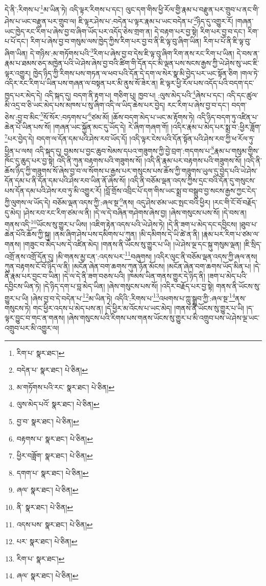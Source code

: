 དེ་ནི་:རིགས་པ་\footnote{རིག་པ་  སྣར་ཐང་། }མ་ཡིན་ཏེ། འདི་ལྟར་རིགས་པ་དང་། ལུང་དག་གིས་ཕྱི་རོལ་གྱི་རྣམ་པ་བརྫུན་པར་གྲུབ་པ་ནང་གི་ཤེས་པ་ཡང་བརྫུན་པར་གྲུབ་ལ། ཇི་ལྟར་ཤེས་པ་:བདེན་པ་ལྟར་རྣམ་པ་ཡང་བདེན་པ་\footnote{བདེན་པ་  སྣར་ཐང་།  པེ་ཅིན། }ཉིད་དུ་འགྱུར་རོ། །གཞན་ཡང་ཁྱེད་རང་རིག་པ་ཞེས་བྱ་བ་ཞིག་ཡོད་པར་འདོད་ཅེས་གྲག་ན། དེ་བརྟག་པར་བྱ་སྟེ། རིག་པར་བྱ་བ་དང་། རིག་པ་པོ་དང་། རིག་པ་ཞེས་བྱ་བ་གསུམ་ལས་ཁྱེད་ཀྱིས་རིག་པར་བྱ་བ་ནི་ཇི་ལྟ་བུ་ཞིག་ཡིན། རིག་པ་པོ་ནི་ཇི་ལྟ་བུ་ཞིག་ཡིན། དེ་གཉིས་:མ་གཏོགས་པའི་\footnote{མ་གཏོགས་པའི་རང་  སྣར་ཐང་།  པེ་ཅིན། }རིག་པ་ཞེས་བྱ་བ་དེས་ཇི་ལྟ་བུ་ཞིག་རིག་ནས་རང་རིག་པ་ཡིན། དེ་བས་ན་རྣམ་པ་ཐམས་ཅད་མཁྱེན་པའི་ཡེ་ཤེས་ཞེས་བྱ་བའི་ཚིག་གི་དོན་དང་མི་ལྡན་པས་སངས་རྒྱས་ཀྱི་ཡེ་ཤེས་སུ་ཡང་ཇི་ལྟར་འགྱུར། ཁྱེད་ཉིད་ཀྱི་རིགས་པས་གཏན་ལ་ཕབ་པའི་དོན་དེ་དག་ལ་སེར་སྣ་མི་བྱེད་པར་ཡང་སྟོན་ཅིག །གལ་ཏེ་འདིར་རང་རིག་པ་ཡིན་པས་གཞན་ལ་བསྟན་པར་མི་ནུས་སོ་ཟེར་ན། ཇི་ལྟར་ཕྱི་རོལ་པས་འདོད་པའི་བདག་དང་ཁྱད་པར་མེད་དེ། འདི་སྐད་དུ། བདག་ནི་རྟག་པ། གཅིག་པུ། ཁྱབ་པ། :ལུས་མེད་པའི་\footnote{ལུས་མེད་པའོ་  སྣར་ཐང་།  པེ་ཅིན། }ཞེས་པ་དང་། འདི་དང་ཚུལ་མི་འདྲ་བ་ཅི་ཡང་མེད་པས་མཁས་པ་སུ་ཞིག་འདི་ལ་ཡིད་ཆེས་པར་བྱེད། རང་རིག་པ་ཞེས་བྱ་བ་དང་། བདག་ཅེས་:བྱ་བ་མིང་\footnote{བྱ་བ་  སྣར་ཐང་།  པེ་ཅིན། }སོ་སོར་:བཏགས་པ་\footnote{བརྟགས་པ་  སྣར་ཐང་།  པེ་ཅིན། }ཙམ་མོ། །ཆོས་བདག་མེད་པ་ཡང་མ་རྟོགས་ཏེ། འདི་ཉིད་བདག་ཏུ་འཛིན་པ་ཆེན་པོ་ཡིན་པས་སོ། །གཞན་ཡང་སྐྱོན་མང་དུ་ཡོད་དེ། རེ་ཞིག་གཞག་གོ། །འདིར་རྣམ་པ་མེད་པར་སྨྲ་བ་:ཕྱིར་ཟློག་\footnote{ཕྱིར་བཟློག་  སྣར་ཐང་།  པེ་ཅིན། }པར་བྱེད་དེ། བདག་ལ་དོན་དམ་པའི་ཤེས་རབ་ཡོད་དོ། །འདི་ལྟར་ངེས་པའི་དོན་སྟོན་པའི་ཤེས་རབ་ཀྱི་ཕ་རོལ་ཏུ་ཕྱིན་པ་ལས། འདི་སྐད་དུ། བྱམས་པ་བྱང་ཆུབ་སེམས་དཔའ་གཟུགས་ཀྱི་བྱེ་བྲག་:གདགས་པ་\footnote{དགག་པ་  སྣར་ཐང་།  པེ་ཅིན། }རྣམ་པ་གསུམ་གྱིས་ཁོང་དུ་ཆུད་པར་བྱ་སྟེ། འདི་ནི་ཀུན་བརྟགས་པའི་གཟུགས་སོ། །འདི་ནི་རྣམ་པར་བརྟགས་པའི་གཟུགས་སོ། །འདི་ནི་ཆོས་ཉིད་ཀྱི་གཟུགས་སོ་ཞེས་བྱ་བ་ལ་སོགས་པ་རྒྱས་པར་གསུངས་པས་ཆོས་ཀྱི་གཟུགས་ཡུལ་དུ་བྱེད་པའི་ཡེ་ཤེས་དོན་དམ་པ་ནི་དོན་དམ་པའི་ཤེས་རབ་ཡིན་ནོ་ཞེས་སོ། །འདི་ནི་བཅོམ་ལྡན་འདས་ཀྱིས་དྲང་བའི་དོན་དུ་གསུངས་པས་དོན་དམ་པའི་ཤེས་རབ་ཏུ་མི་འགྱུར་རོ། །བློ་གྲོས་འབྲིང་པོ་དག་གིས་ཡང་སྨྲ་བ་བསྒྲུབ་བྱ་སངས་རྒྱས་ཀྱང་ངེད་ཀྱི་ལུགས་ལ་ཡོད་དེ། བཅོམ་ལྡན་འདས་ཀྱི་:ཞལ་སྔ་\footnote{ཞལ་  སྣར་ཐང་།  པེ་ཅིན། }ནས། འདུ་ཤེས་ཙམ་ཡང་སྤང་བའི་ཕྱིར། །རང་གི་ངོ་བོ་བརྗོད་དུ་མེད། །ཤེས་རབ་རང་རིག་ཙམ་ལ་ནི། །དེ་ལ་དེ་བཞིན་གཤེགས་ཞེས་བྱ། །ཞེས་གསུངས་པས་སོ། །དེ་བས་ན། གནས་འདི་\footnote{ནི་  སྣར་ཐང་།  པེ་ཅིན། }ཡོངས་སུ་གྱུར་པ་ཡིས། །འཇིག་རྟེན་འདས་པའི་ཡེ་ཤེས་ཏེ། །དེ་ནི་ཟག་པ་མེད་དང་དབྱིངས། །ཐུབ་པ་ཆེན་པོའི་ཆོས་ཀྱི་སྐུ། །ནམ་ཞིག་ཤེས་པས་དམིགས་པ་ཀུན། །མི་དམིགས་དེ་ཡི་ཚེ་ན་ནི། །རྣམ་པར་རིག་པ་ཙམ་ལ་གནས། །གཟུང་བ་མེད་པས་དེ་འཛིན་མེད། །གནས་ནི་ཡོངས་སུ་གྱུར་པ་ཡི། །ཡེ་ཤེས་ལྔ་དང་སྐུ་གསུམ་ལྡན། །ཇི་སྲིད་འགྲོ་ནས་འགྲོ་དོན་དུ། །མི་གནས་མྱ་ངན་:འདས་པར་\footnote{འདས་པས་  སྣར་ཐང་།  པེ་ཅིན། }བཞུགས། །འདིར་ལུང་ནི་བཅོམ་ལྡན་འདས་ཀྱི་ཞལ་ནས། ཀུན་བརྟགས་ངོ་བོ་ཉིད་ལ་ནི། །མངོན་ཞེན་བག་ཆགས་ཀུན་ཉོན་མོངས། །མངོན་ཞེན་བག་ཆགས་ཡོད་མིན་པ། །དེ་ནི་རྣམ་པར་བྱང་བ་ཡིན། །དེ་ལ་དེ་ནི་ཟག་བཅས་པའི། །ཁམས་ཡིན་གནས་གྱུར་དེ་ཉིད་ནི། །ཟག་པ་མེད་པའི་དབྱིངས་ཡིན་ཏེ། །དེ་ཉིད་དག་པ་བླ་མེད་ཡིན། །ཞེས་གསུངས་པས་སོ། །འདིར་བརྗོད་པར་བྱ་སྟེ། གནས་ནི་ཡོངས་སུ་གྱུར་པ་ཡི། །ཞེས་བྱ་བ་དེ་བདེན་པ་\footnote{པར་  སྣར་ཐང་།  པེ་ཅིན། }མ་ཡིན་ཏེ། འདིའི་:རིགས་པ་\footnote{རིག་པ་  སྣར་ཐང་། }འཕགས་པ་ཀླུ་སྒྲུབ་ཀྱི་:ཞལ་སྔ་\footnote{ཞལ་  སྣར་ཐང་།  པེ་ཅིན། }ནས་གསུངས་ཏེ། གང་ཕྱིར་འདས་པ་མེད་པས་ན། །དེ་ཕྱིར་མ་འོངས་པ་ཡང་མེད། །གནས་ནི་ཡོངས་སུ་གྱུར་པ་ཡི། །ད་ལྟར་བྱུང་བ་གང་ན་གནས། །ཞེས་གསུངས་པའི་རིགས་པས་གནས་ཡོངས་སུ་གྱུར་པ་མི་འགྲུབ་པས་ཡེ་ཤེས་ལྔ་ཡང་འགྲུབ་པར་མི་འགྱུར་ལ། 